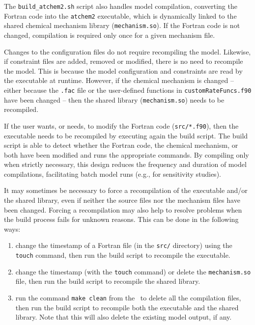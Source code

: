 The \texttt{build\_atchem2.sh} script also handles model compilation, converting the Fortran
code into the \texttt{atchem2} executable, which is dynamically linked to the shared chemical
mechanism library (\texttt{mechanism.so}). If the Fortran code is not changed, compilation is
required only once for a given mechanism file.

Changes to the configuration files do not require recompiling the model. Likewise, if
constraint files are added, removed or modified, there is no need to recompile the model. This
is because the model configuration and constraints are read by the executable at
runtime. However, if the chemical mechanism is changed -- either because the \texttt{.fac} file
or the user-defined functions in \texttt{customRateFuncs.f90} have been changed -- then the
shared library (\texttt{mechanism.so}) needs to be recompiled.

If the user wants, or needs, to modify the Fortran code (\texttt{src/*.f90}), then the
executable needs to be recompiled by executing again the build script. The build script is able
to detect whether the Fortran code, the chemical mechanism, or both have been modified and runs
the appropriate commands. By compiling only when strictly necessary, this design reduces the
frequency and duration of model compilations, facilitating batch model runs (e.g., for
sensitivity studies).

It may sometimes be necessary to force a recompilation of the executable and/or the shared
library, even if neither the source files nor the mechanism files have been changed. Forcing a
recompilation may also help to resolve problems when the build process fails for unknown
reasons. This can be done in the following ways:

\begin{enumerate}
\item change the timestamp of a Fortran file (in the \texttt{src/} directory) using the
  \verb|touch| command, then run the build script to recompile the executable.
\item change the timestamp (with the \verb|touch| command) or delete the \texttt{mechanism.so}
  file, then run the build script to recompile the shared library.
\item run the command \verb|make clean| from the \maindir\ to delete all the compilation files,
  then run the build script to recompile both the executable and the shared library. Note that
  this will also delete the existing model output, if any.
\end{enumerate}

